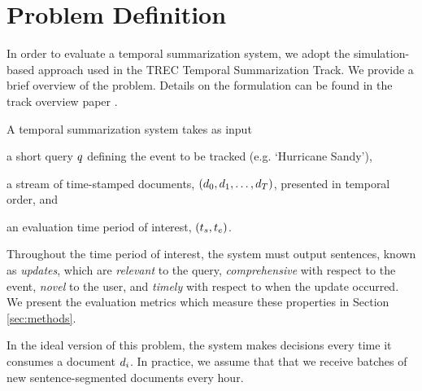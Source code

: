 \section{Problem Definition}
\label{sec:problemdefinition}
In order to evaluate a temporal summarization system, we adopt the simulation-based approach used in the TREC Temporal Summarization Track.  We provide a brief overview of the problem.  Details on the formulation can be found in the track overview paper \cite{aslam2013trec}.  

A temporal summarization system takes as input 
\begin{enumerate*}[label=\itshape\alph*\upshape)]
  \item a short query $q$ defining the event to be tracked (e.g. `Hurricane Sandy'), 
  \item a stream of time-stamped documents, $(\operatorname{\mathnormal{d}}_0, \operatorname{\mathnormal{d}}_1,\ldots,\operatorname{\mathnormal{d}}_T)$, presented in temporal order, and
	\item an evaluation time period of interest, $(t_s,t_e)$.  
\end{enumerate*}
Throughout the time period of interest, the system must output sentences, known as \emph{updates}, which are \emph{relevant} to the query, \emph{comprehensive} with respect to the event, \emph{novel} to the user, and \emph{timely} with respect to when the update occurred.  We present the evaluation metrics which measure these properties in Section \ref{sec:methods}.  

In the ideal version of this problem, the system makes decisions every time it consumes a document $\operatorname{\mathnormal{d}}_i$.  In practice, we assume that that we receive batches of new sentence-segmented documents every hour.  
